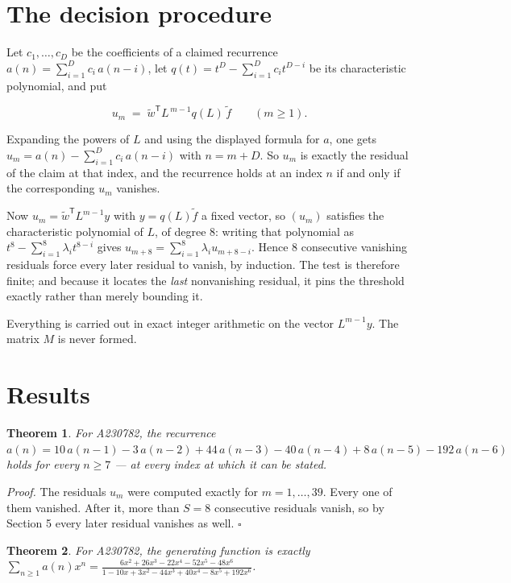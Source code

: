 \documentclass[11pt]{article}
\newtheorem{theorem}{Theorem}
\theoremstyle{definition}
\begin{document}
\section{The decision procedure}

Let $c_1,\dots,c_D$ be the coefficients of a claimed recurrence $a(n) = \sum_{i=1}^{D} c_i\,a(n-i)$, let $q(t) = t^{D} - \sum_{i=1}^{D} c_i t^{D-i}$ be its characteristic polynomial, and put

\[u_m \;=\; \tilde w^{\mathsf T} L^{\,m-1} q(L)\,\tilde f \qquad (m \ge 1).\]

Expanding the powers of $L$ and using the displayed formula for $a$, one gets $u_m = a(n) - \sum_{i=1}^{D} c_i\,a(n-i)$ with $n = m + D$. So $u_m$ is exactly the residual of the claim at that index, and the recurrence holds at an index $n$ if and only if the corresponding $u_m$ vanishes.

Now $u_m = \tilde w^{\mathsf T} L^{m-1} y$ with $y = q(L)\tilde f$ a fixed vector, so $(u_m)$ satisfies the characteristic polynomial of $L$, of degree $8$: writing that polynomial as $t^{8} - \sum_{i=1}^{8} \lambda_i t^{8-i}$ gives $u_{m+8} = \sum_{i=1}^{8} \lambda_i u_{m+8-i}$. Hence $8$ consecutive vanishing residuals force every later residual to vanish, by induction. The test is therefore finite; and because it locates the {\itshape last} nonvanishing residual, it pins the threshold exactly rather than merely bounding it.

Everything is carried out in exact integer arithmetic on the vector $L^{m-1}y$. The matrix $M$ is never formed.

\section{Results}

\begin{theorem} For A230782, the recurrence $a(n) = 10\,a(n-1) - 3\,a(n-2) + 44\,a(n-3) - 40\,a(n-4) + 8\,a(n-5) - 192\,a(n-6)$ holds for every $n \ge 7$ --- at every index at which it can be stated.\end{theorem}

{\itshape Proof.} The residuals $u_m$ were computed exactly for $m = 1,\dots,39$. Every one of them vanished. After it, more than $S = 8$ consecutive residuals vanish, so by Section 5 every later residual vanishes as well. $\square$

\begin{theorem} For A230782, the generating function is exactly $\sum_{n\ge 1} a(n)x^n = \frac{6x^{2} + 26x^{3} - 22x^{4} - 52x^{5} - 48x^{6}}{1 - 10x + 3x^{2} - 44x^{3} + 40x^{4} - 8x^{5} + 192x^{6}}$.\end{theorem}
\end{document}
